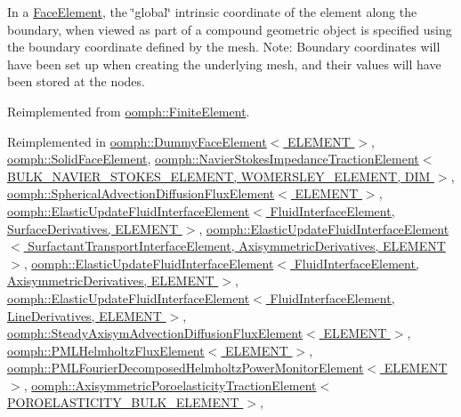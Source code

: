 In a \hyperlink{classoomph_1_1FaceElement}{Face\+Element}, the \char`\"{}global\char`\"{} intrinsic coordinate of the element along the boundary, when viewed as part of a compound geometric object is specified using the boundary coordinate defined by the mesh. Note\+: Boundary coordinates will have been set up when creating the underlying mesh, and their values will have been stored at the nodes. 



Reimplemented from \hyperlink{classoomph_1_1FiniteElement_a849561c5fbcbc07dc49d2dc6cca68559}{oomph\+::\+Finite\+Element}.



Reimplemented in \hyperlink{classoomph_1_1DummyFaceElement_a2ee49bd3158d30c0c84c63dbd25e7196}{oomph\+::\+Dummy\+Face\+Element$<$ E\+L\+E\+M\+E\+N\+T $>$}, \hyperlink{classoomph_1_1SolidFaceElement_a28526b0f7a7daa2ab90348e16cf6a529}{oomph\+::\+Solid\+Face\+Element}, \hyperlink{classoomph_1_1NavierStokesImpedanceTractionElement_a3be6b5b3152e35c76339a5de6ec1e93a}{oomph\+::\+Navier\+Stokes\+Impedance\+Traction\+Element$<$ B\+U\+L\+K\+\_\+\+N\+A\+V\+I\+E\+R\+\_\+\+S\+T\+O\+K\+E\+S\+\_\+\+E\+L\+E\+M\+E\+N\+T, W\+O\+M\+E\+R\+S\+L\+E\+Y\+\_\+\+E\+L\+E\+M\+E\+N\+T, D\+I\+M $>$}, \hyperlink{classoomph_1_1SphericalAdvectionDiffusionFluxElement_ab7dc1526807ada4b9189526b69653c91}{oomph\+::\+Spherical\+Advection\+Diffusion\+Flux\+Element$<$ E\+L\+E\+M\+E\+N\+T $>$}, \hyperlink{classoomph_1_1ElasticUpdateFluidInterfaceElement_a41706192ce4de3c4c51a70086199d8fa}{oomph\+::\+Elastic\+Update\+Fluid\+Interface\+Element$<$ Fluid\+Interface\+Element, Surface\+Derivatives, E\+L\+E\+M\+E\+N\+T $>$}, \hyperlink{classoomph_1_1ElasticUpdateFluidInterfaceElement_a41706192ce4de3c4c51a70086199d8fa}{oomph\+::\+Elastic\+Update\+Fluid\+Interface\+Element$<$ Surfactant\+Transport\+Interface\+Element, Axisymmetric\+Derivatives, E\+L\+E\+M\+E\+N\+T $>$}, \hyperlink{classoomph_1_1ElasticUpdateFluidInterfaceElement_a41706192ce4de3c4c51a70086199d8fa}{oomph\+::\+Elastic\+Update\+Fluid\+Interface\+Element$<$ Fluid\+Interface\+Element, Axisymmetric\+Derivatives, E\+L\+E\+M\+E\+N\+T $>$}, \hyperlink{classoomph_1_1ElasticUpdateFluidInterfaceElement_a41706192ce4de3c4c51a70086199d8fa}{oomph\+::\+Elastic\+Update\+Fluid\+Interface\+Element$<$ Fluid\+Interface\+Element, Line\+Derivatives, E\+L\+E\+M\+E\+N\+T $>$}, \hyperlink{classoomph_1_1SteadyAxisymAdvectionDiffusionFluxElement_a0aee153365d2f5e3cefac8b0ff38150b}{oomph\+::\+Steady\+Axisym\+Advection\+Diffusion\+Flux\+Element$<$ E\+L\+E\+M\+E\+N\+T $>$}, \hyperlink{classoomph_1_1PMLHelmholtzFluxElement_a660d5d2b8d4b49a504b0f6c95348891a}{oomph\+::\+P\+M\+L\+Helmholtz\+Flux\+Element$<$ E\+L\+E\+M\+E\+N\+T $>$}, \hyperlink{classoomph_1_1PMLFourierDecomposedHelmholtzPowerMonitorElement_a4618f13a3a0d53cc95a2f4951f7e40e9}{oomph\+::\+P\+M\+L\+Fourier\+Decomposed\+Helmholtz\+Power\+Monitor\+Element$<$ E\+L\+E\+M\+E\+N\+T $>$}, \hyperlink{classoomph_1_1AxisymmetricPoroelasticityTractionElement_a8c215f2c9d8b8e66513397b102b1e4aa}{oomph\+::\+Axisymmetric\+Poroelasticity\+Traction\+Element$<$ P\+O\+R\+O\+E\+L\+A\+S\+T\+I\+C\+I\+T\+Y\+\_\+\+B\+U\+L\+K\+\_\+\+E\+L\+E\+M\+E\+N\+T $>$}, 